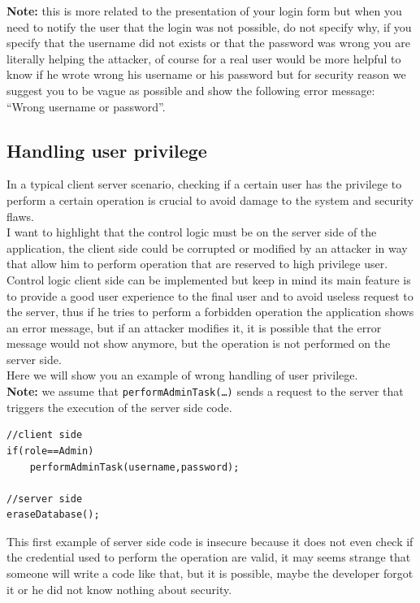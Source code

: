 \textbf{Note:} this is more related to the presentation of your login form but when you need to notify the user that the login was not possible, do not specify why, if you specify that the username did not exists or that the password was wrong you are literally helping the attacker, of course for a real user would be more helpful to know if he wrote wrong his username or his password but for security reason we suggest you to be vague as possible and show the following error message: “Wrong username or password”.

\subsection{Handling user privilege}
In a typical client server scenario, checking if a certain user has the privilege to perform a certain operation is crucial to avoid damage to the system and security flaws.\\

I want to highlight that the control logic must be on the server side of the application, the client side could be corrupted or modified by an attacker in way that allow him to perform operation that are reserved to high privilege user.\\

Control logic client side can be implemented but keep in mind its main feature is to provide a good user experience to the final user and to avoid useless request to the server, thus if he tries to perform a forbidden operation the application shows an error message, but if an attacker modifies it, it is possible that the error message would not show anymore, but the operation is not performed on the server side.\\

Here we will show you an example of wrong handling of user privilege.\\
\textbf{Note:} we assume that \texttt{performAdminTask(…)} sends a request to the server that triggers the execution of the server side code.

\begin{lstlisting}
//client side
if(role==Admin)
	performAdminTask(username,password);

//server side
eraseDatabase();
\end{lstlisting}

This first example of server side code is insecure because it does not even check if the credential used to perform the operation are valid, it may seems strange that someone will write a code like that, but it is possible, maybe the developer forgot it or he did not know nothing about security.\\

